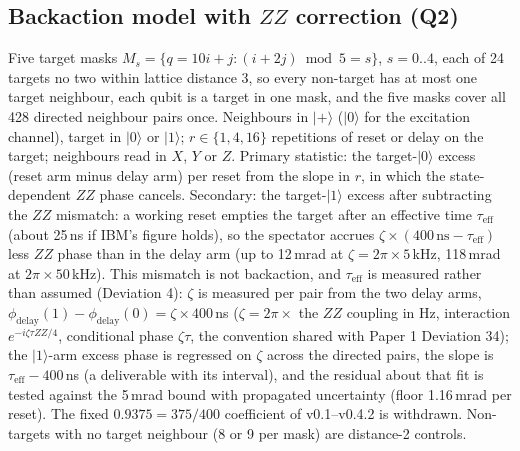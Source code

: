 \documentclass[aps,pra,reprint,superscriptaddress,nofootinbib,longbibliography,amsmath,amssymb]{revtex4-2}
\begin{document}
\subsection{Backaction model with $ZZ$ correction (Q2)}
Five target masks $M_s = \{q = 10i + j : (i + 2j) \bmod 5 = s\}$, $s = 0..4$, each of 24 targets no two within lattice distance 3, so every non-target has at most one target neighbour, each qubit is a target in one mask, and the five masks cover all 428 directed neighbour pairs once. Neighbours in $|+\rangle$ ($|0\rangle$ for the excitation channel), target in $|0\rangle$ or $|1\rangle$; $r \in \{1, 4, 16\}$ repetitions of reset or delay on the target; neighbours read in $X$, $Y$ or $Z$. Primary statistic: the target-$|0\rangle$ excess (reset arm minus delay arm) per reset from the slope in $r$, in which the state-dependent $ZZ$ phase cancels. Secondary: the target-$|1\rangle$ excess after subtracting the $ZZ$ mismatch: a working reset empties the target after an effective time $\tau_{\mathrm{eff}}$ (about 25\,ns if IBM's figure holds), so the spectator accrues $\zeta\times(400\,\mathrm{ns} - \tau_{\mathrm{eff}})$ less $ZZ$ phase than in the delay arm (up to 12\,mrad at $\zeta = 2\pi\times5$\,kHz, 118\,mrad at $2\pi\times50$\,kHz). This mismatch is not backaction, and $\tau_{\mathrm{eff}}$ is measured rather than assumed (Deviation 4): $\zeta$ is measured per pair from the two delay arms, $\phi_{\mathrm{delay}}(1) - \phi_{\mathrm{delay}}(0) = \zeta\times400$\,ns ($\zeta = 2\pi\times$ the $ZZ$ coupling in Hz, interaction $e^{-i\zeta\tau Z Z/4}$, conditional phase $\zeta\tau$, the convention shared with Paper 1 Deviation 34); the $|1\rangle$-arm excess phase is regressed on $\zeta$ across the directed pairs, the slope is $\tau_{\mathrm{eff}} - 400$\,ns (a deliverable with its interval), and the residual about that fit is tested against the 5\,mrad bound with propagated uncertainty (floor 1.16\,mrad per reset). The fixed $0.9375 = 375/400$ coefficient of v0.1--v0.4.2 is withdrawn. Non-targets with no target neighbour (8 or 9 per mask) are distance-2 controls.
\end{document}
